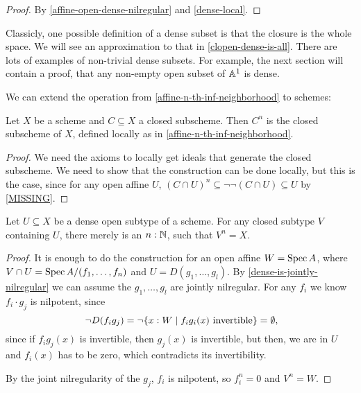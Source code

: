 \begin{proof}
  By \cref{affine-open-dense-nilregular} and \cref{dense-local}.
\end{proof}

Classicly, one possible definition of a dense subset
is that the closure is the whole space.
We will see an approximation to that in \cref{clopen-dense-is-all}.
There are lots of examples of non-trivial dense subsets.
For example, the next section will contain a proof,
that any non-empty open subset of $\mathbb{A}^1$ is dense.


We can extend the operation from \cref{affine-n-th-inf-neighborhood}
to schemes:

\begin{definition}%
  Let $X$ be a scheme and $C\subseteq X$ a closed subscheme.
  Then $C^n$ is the closed subscheme of $X$,
  defined locally as in \cref{affine-n-th-inf-neighborhood}.
\end{definition}

\begin{proof}
  We need the axioms to locally get ideals that generate the closed subscheme.
  We need to show that the construction can be done locally,
  but this is the case, since for any open affine $U$,
  $(C\cap U)^n\subseteq \neg\neg (C\cap U)\subseteq U$ by \cref{MISSING}.
\end{proof}

\begin{lemma}%
  \label{dense-closed-n-th-neighborhood}
  Let $U\subseteq X$ be a dense open subtype of a scheme.
  For any closed subtype $V$ containing $U$,
  there merely is an $n:\mathbb{N}$, such that $V^n=X$.
\end{lemma}

\begin{proof}
  It is enough to do the construction for an open affine $W=\operatorname{Spec} A$,
  where $V\cap U=\operatorname{Spec} A/(f_1,\dots,f_n)$ and
  $U=D(g_1,\dots,g_l)$.
  By \cref{dense-is-jointly-nilregular} we can assume the $g_1,\dots,g_l$
  are jointly nilregular.
  For any $f_i$ we know $f_i\cdot g_j$ is nilpotent, since
  \[ \neg D(f_ig_j)=\neg\{x:W\mid f_ig_i(x)\text{ invertible}\} =\emptyset\rlap{,}\]
  since if $f_ig_j(x)$ is invertible, then $g_j(x)$ is invertible, but then, we are in
  $U$ and $f_i(x)$ has to be zero, which contradicts its invertibility.

  By the joint nilregularity of the $g_j$, $f_i$ is nilpotent,
  so $f_i^n=0$ and $V^n=W$.
\end{proof}

